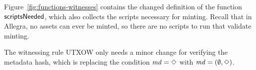 Figure~\ref{fig:functions-witnesses} contains the changed definition
of the function $\mathsf{scriptsNeeded}$, which also collects the scripts
necessary for minting.
Recall that in Allegra, no assets can ever be minted, so there are no scripts to run that
validate minting.

The witnessing rule UTXOW only needs a minor change for verifying the metadata hash,
which is replacing the condition $\mathit{md} = \Diamond$ with $\mathit{md} = (\emptyset, \Diamond)$.
